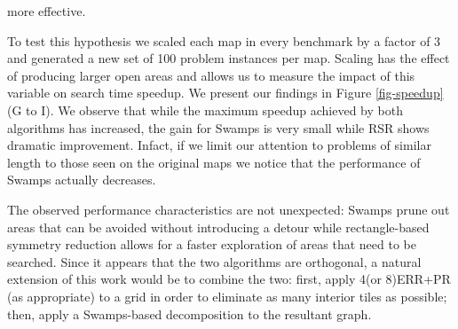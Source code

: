 more effective.
\par
To test this hypothesis we scaled each map in every benchmark by a factor of 3
and generated a new set of 100 problem instances per map. 
Scaling has the effect of producing larger open areas and allows 
us to measure the impact of this variable on search time speedup.
We present our findings in  Figure \ref{fig-speedup} (G to I).
We observe that while the maximum speedup achieved by both algorithms has
increased, the gain for Swamps is very small while RSR shows dramatic
improvement.
Infact, if we limit our attention to problems of similar length to those seen 
on the original maps we notice that the performance of Swamps actually
decreases.
\par
The observed performance characteristics are not unexpected: 
Swamps prune out areas that can be avoided without introducing a detour while 
rectangle-based symmetry reduction allows for a faster exploration of areas that need to be searched.
Since it appears that the two algorithms are orthogonal, a natural extension of this work would 
be to combine the two: 
first, apply 4(or 8)ERR+PR (as appropriate) to a grid in order to eliminate as many interior tiles 
as possible; then, apply a Swamps-based decomposition to the resultant graph.
